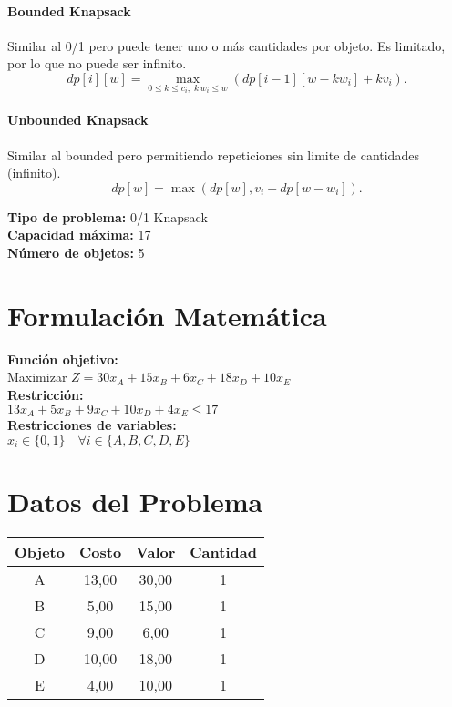 \documentclass{article}
\begin{document}
\paragraph{Bounded Knapsack} Similar al 0/1 pero puede tener uno o más cantidades por objeto. Es limitado, por lo que no puede ser infinito. 
\[
dp[i][w] = 
\max_{0 \leq k \leq c_i,\; k\,w_i \leq w} \left( dp[i-1][w - k w_i] + k v_i \right).
\]

\paragraph{Unbounded Knapsack} Similar al bounded pero permitiendo repeticiones sin limite de cantidades (infinito).
\[
dp[w] = \max ( dp[w], v_i + dp[w - w_i] ).
\]

\thispagestyle{empty}
\newpage
\textbf{Tipo de problema:} 0/1 Knapsack\\
\textbf{Capacidad máxima:} 17\\
\textbf{Número de objetos:} 5\\

\section*{Formulación Matemática}
\textbf{Función objetivo:}\\
Maximizar $Z = 30 x_{A} + 15 x_{B} + 6 x_{C} + 18 x_{D} + 10 x_{E}$\\

\textbf{Restricción:}\\
$13 x_{A} + 5 x_{B} + 9 x_{C} + 10 x_{D} + 4 x_{E} \leq 17$\\

\textbf{Restricciones de variables:}\\
$x_i \in \{0, 1\} \quad \forall i \in \{A, B, C, D, E\}$\\
\vspace{0.5cm}

\section*{Datos del Problema}
\begin{tabular}{|c|c|c|c|}
\hline
Objeto & Costo & Valor & Cantidad \\
\hline
A & 13,00 & 30,00 & 1 \\
B & 5,00 & 15,00 & 1 \\
C & 9,00 & 6,00 & 1 \\
D & 10,00 & 18,00 & 1 \\
E & 4,00 & 10,00 & 1 \\
\hline
\end{tabular}
\end{document}
